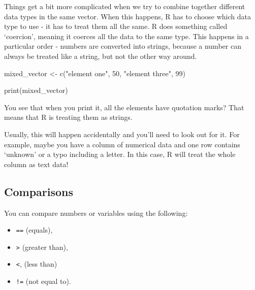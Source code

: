 \documentclass[
  letterpaper,
  DIV=11,
  numbers=noendperiod]{scrreprt}
\newenvironment{Shaded}{\begin{snugshade}}{\end{snugshade}}
\newcommand{\NormalTok}[1]{\textcolor[rgb]{0.00,0.23,0.31}{#1}}
\begin{document}
\begin{tcolorbox}[enhanced jigsaw, coltitle=black, bottomrule=.15mm, title=\textcolor{quarto-callout-warning-color}{\faExclamationTriangle}\hspace{0.5em}{Coercion}, leftrule=.75mm, colframe=quarto-callout-warning-color-frame, breakable, toprule=.15mm, opacityback=0, bottomtitle=1mm, toptitle=1mm, colback=white, rightrule=.15mm, titlerule=0mm, left=2mm, arc=.35mm, opacitybacktitle=0.6, colbacktitle=quarto-callout-warning-color!10!white]

Things get a bit more complicated when we try to combine together
different data types in the same vector. When this happens, R has to
choose which data type to use - it has to treat them all the same. R
does something called `coercion', meaning it coerces all the data to the
same type. This happens in a particular order - numbers are converted
into strings, because a number can always be treated like a string, but
not the other way around.

\begin{Shaded}
\begin{Highlighting}[]
\NormalTok{mixed\_vector \textless{}{-} c("element one", 50, "element three", 99)}

\NormalTok{print(mixed\_vector)}

\end{Highlighting}
\end{Shaded}

You see that when you print it, all the elements have quotation marks?
That means that R is treating them as strings.

Usually, this will happen accidentally and you'll need to look out for
it. For example, maybe you have a column of numerical data and one row
contains `unknown' or a typo including a letter. In this case, R will
treat the whole column as text data!

\end{tcolorbox}

\subsection{Comparisons}\label{comparisons}

You can compare numbers or variables using the following:

\begin{itemize}
\item
  \texttt{==} (equals),
\item
  \texttt{\textgreater{}} (greater than),
\item
  \texttt{\textless{}}, (less than)
\item
  \texttt{!=} (not equal to).
\end{itemize}
\end{document}
